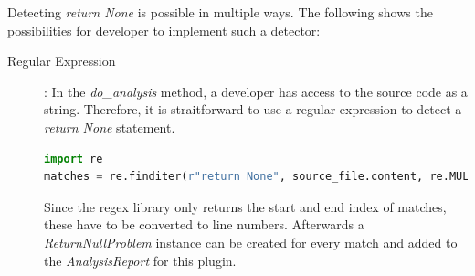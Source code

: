 Detecting \textit{return None} is possible in multiple ways. The following shows the possibilities for developer to implement such a detector:
\begin{description}
    \item[Regular Expression]: In the \textit{do\_analysis} method, a developer has access to the source code as a string. Therefore, it is straitforward to use a regular expression to detect a \textit{return None} statement.
    \begin{lstlisting}[language=Python]
import re
matches = re.finditer(r"return None", source_file.content, re.MULTILINE | re.DOTALL) \end{lstlisting}
    Since the regex library only returns the start and end index of matches, these have to be converted to line numbers. Afterwards a \textit{ReturnNullProblem} instance can be created for every match and added to the \textit{AnalysisReport} for this plugin.


\end{description}
